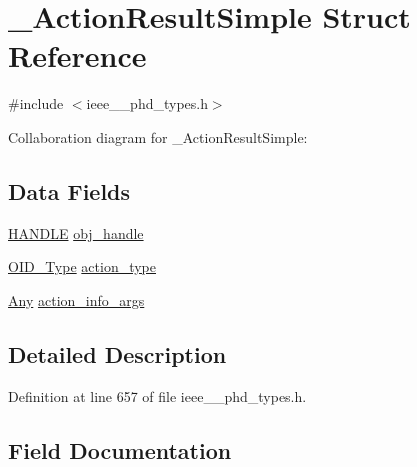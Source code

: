 \hypertarget{struct___action_result_simple}{}\section{\+\_\+\+Action\+Result\+Simple Struct Reference}
\label{struct___action_result_simple}


{\ttfamily \#include $<$ieee\+\_\+\_\+phd\+\_\+types.\+h$>$}



Collaboration diagram for \+\_\+\+Action\+Result\+Simple\+:
\subsection*{Data Fields}
\begin{DoxyCompactItemize}
\item 
\hyperlink{ieee__11073__phd__types_8h_a76f0d44d294babf2e568f7ee676ffca6}{H\+A\+N\+D\+L\+E} \hyperlink{struct___action_result_simple_abbfff52b7a4956021522f5750c4b32c6}{obj\+\_\+handle}
\item 
\hyperlink{ieee__11073__phd__types_8h_aa4d7af235d4a95d6632aa0d64160dd62}{O\+I\+D\+\_\+\+Type} \hyperlink{struct___action_result_simple_aa7cb846e240dc56bd1c2fcc0ee736fd5}{action\+\_\+type}
\item 
\hyperlink{ieee__11073__phd__types_8h_a4decf91c0c44a2ed84549e41307f5fdb}{Any} \hyperlink{struct___action_result_simple_aa60d83842c341dc10b70484bfb38634c}{action\+\_\+info\+\_\+args}
\end{DoxyCompactItemize}


\subsection{Detailed Description}


Definition at line 657 of file ieee\+\_\+\_\+phd\+\_\+types.\+h.



\subsection{Field Documentation}
\hypertarget{struct___action_result_simple_aa60d83842c341dc10b70484bfb38634c}{}
